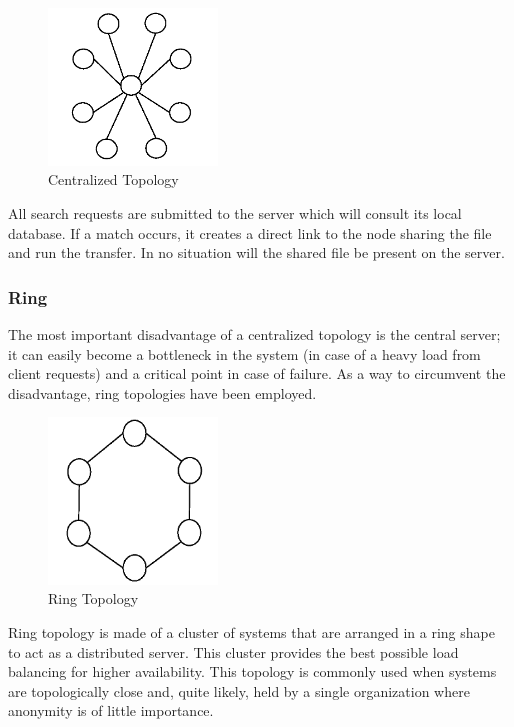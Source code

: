 \begin{figure}
  \centering
  \includegraphics[width=0.4\textwidth]{src/img/p2p-systems/centralized}
  \caption{Centralized Topology}
  \label{fig:p2p-systems:centralized}
\end{figure}

All search requests are submitted to the server which will consult its local
database. If a match occurs, it creates a direct link to the node sharing the
file and run the transfer. In no situation will the shared file be present on
the server.

\subsubsection{Ring}

The most important disadvantage of a centralized topology is the central
server; it can easily become a bottleneck in the system (in case of a heavy
load from client requests) and a critical point in case of failure. As a way
to circumvent the disadvantage, ring topologies have been employed.

\begin{figure}
  \centering
  \includegraphics[width=0.4\textwidth]{src/img/p2p-systems/ring}
  \caption{Ring Topology}
  \label{fig:p2p-systems:ring}
\end{figure}

Ring topology is made of a cluster of systems that are arranged in a ring shape
to act as a distributed server. This cluster provides the best possible load
balancing for higher availability. This topology is commonly used when systems
are topologically close and, quite likely, held by a single organization where
anonymity is of little importance.

